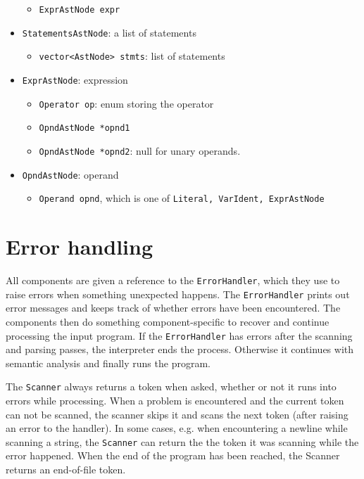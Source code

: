 \documentclass[a4paper]{article}
\newcommand*{\code}[1]{\texttt{#1}}
\begin{document}
\begin{itemize}
  \begin{itemize}
    \item[] \code{ExprAstNode expr}
  \end{itemize}
  \item \code{StatementsAstNode}: a list of statements
  \begin{itemize}
    \item[] \code{vector<AstNode> stmts}: list of statements
  \end{itemize}
  \item \code{ExprAstNode}: expression
  \begin{itemize}
    \item[] \code{Operator op}: enum storing the operator
    \item[] \code{OpndAstNode *opnd1}
    \item[] \code{OpndAstNode *opnd2}: null for unary operands.
  \end{itemize}
  \item \code{OpndAstNode}: operand
  \begin{itemize}
    \item[] \code{Operand opnd}, which is one of 
    \code{Literal, VarIdent, ExprAstNode}
  \end{itemize}
\end{itemize}


\section{Error handling}

All components are given a reference to the \code{ErrorHandler}, 
which they use to raise errors when something unexpected happens.
The \code{ErrorHandler} prints out error messages and keeps track 
of whether errors have been encountered. 
The components then do something component-specific to recover and 
continue processing the input program. If the \code{ErrorHandler} 
has errors after the scanning and parsing passes, the interpreter 
ends the process. Otherwise it continues with semantic analysis 
and finally runs the program.

The \code{Scanner} always returns a token when asked, whether or 
not it runs into errors while processing. When a problem is 
encountered and the current token can not be scanned, the scanner 
skips it and scans the next token (after raising an error to the 
handler). In some cases, e.g. when encountering a newline while 
scanning a string, the \code{Scanner} can return the the token it 
was scanning while the error happened. When the end of the 
program has been reached, the Scanner returns an end-of-file token.
\end{document}
